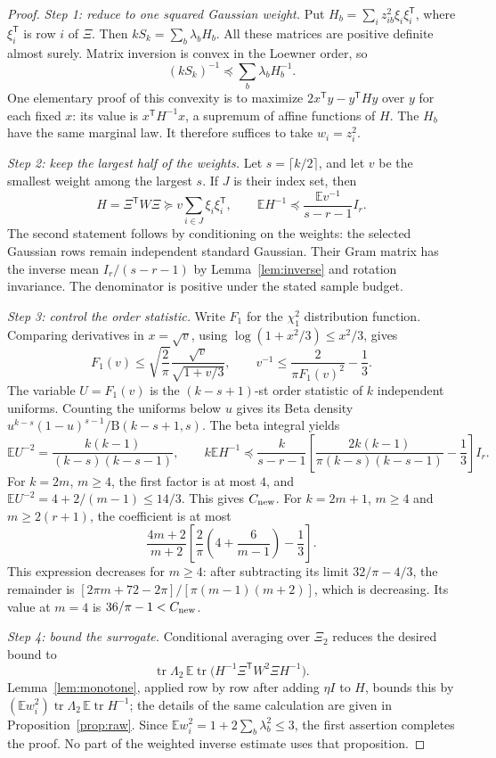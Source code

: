\documentclass[11pt,a4paper]{article}
\theoremstyle{definition}
\theoremstyle{remark}
\numberwithin{equation}{section}
\newcommand{\E}{\mathbb E}
\newcommand{\T}{{\mathsf T}}
\newcommand{\tr}{\operatorname{tr}}
\begin{document}
\begin{proof}
\emph{Step 1: reduce to one squared Gaussian weight.}
Put $H_b=\sum_i z_{ib}^2\xi_i\xi_i^\T$, where $\xi_i^\T$ is row $i$ of $\Xi$.
Then $kS_k=\sum_b\lambda_bH_b$. All these matrices are positive definite
almost surely. Matrix inversion is convex in the Loewner order, so
\[
 (kS_k)^{-1}\preceq\sum_b\lambda_bH_b^{-1}.
\]
One elementary proof of this convexity is to maximize
$2x^\T y-y^\T Hy$ over $y$ for each fixed $x$: its value is
$x^\T H^{-1}x$, a supremum of affine functions of $H$.
The $H_b$ have the same marginal law. It therefore suffices to take
$w_i=z_i^2$.

\emph{Step 2: keep the largest half of the weights.}
Let $s=\lceil k/2\rceil$, and let $v$ be the smallest weight among the
largest $s$. If $J$ is their index set, then
\[
 H=\Xi^\T W\Xi\succeq v\sum_{i\in J}\xi_i\xi_i^\T,
 \qquad
 \E H^{-1}\preceq\frac{\E v^{-1}}{s-r-1}I_r.
\]
The second statement follows by conditioning on the weights: the selected
Gaussian rows remain independent standard Gaussian. Their Gram matrix has
the inverse mean $I_r/(s-r-1)$ by Lemma~\ref{lem:inverse} and rotation
invariance. The denominator is positive under the stated sample budget.

\emph{Step 3: control the order statistic.}
Write $F_1$ for the $\chi_1^2$ distribution function. Comparing derivatives
in $x=\sqrt v$, using $\log(1+x^2/3)\le x^2/3$, gives
\[
 F_1(v)\le\sqrt{\frac2\pi}\frac{\sqrt v}{\sqrt{1+v/3}},
 \qquad
 v^{-1}\le\frac{2}{\pi F_1(v)^2}-\frac13.
\]
The variable $U=F_1(v)$ is the $(k-s+1)$-st order statistic of $k$
independent uniforms. Counting the uniforms below $u$ gives its Beta density
$u^{k-s}(1-u)^{s-1}/\mathrm B(k-s+1,s)$. The beta integral yields
\[
 \E U^{-2}=\frac{k(k-1)}{(k-s)(k-s-1)},
 \qquad
 k\E H^{-1}\preceq
 \frac{k}{s-r-1}
 \left[\frac{2k(k-1)}{\pi(k-s)(k-s-1)}-\frac13\right]I_r.
\]
For $k=2m$, $m\ge4$, the first factor is at most $4$, and
$\E U^{-2}=4+2/(m-1)\le14/3$. This gives $C_{\rm new}$.
For $k=2m+1$, $m\ge4$ and $m\ge2(r+1)$, the coefficient is at most
\[
 \frac{4m+2}{m+2}\left[\frac{2}{\pi}\left(4+\frac6{m-1}\right)-\frac13\right].
\]
This expression decreases for $m\ge4$: after subtracting its limit
$32/\pi-4/3$, the remainder is
$[2\pi m+72-2\pi]/[\pi(m-1)(m+2)]$, which is decreasing.
Its value at $m=4$ is $36/\pi-1<C_{\rm new}$.

\emph{Step 4: bound the surrogate.}
Conditional averaging over $\Xi_2$ reduces the desired bound to
\[
 \tr\Lambda_2\,
 \E\tr\bigl(H^{-1}\Xi^\T W^2\Xi H^{-1}\bigr).
\]
Lemma~\ref{lem:monotone}, applied row by row after adding $\eta I$ to $H$,
bounds this by $(\E w_i^2)\tr\Lambda_2\,\E\tr H^{-1}$; the details of
the same calculation are given in Proposition~\ref{prop:raw}.
Since $\E w_i^2=1+2\sum_b\lambda_b^2\le3$, the first assertion completes
the proof. No part of the weighted inverse estimate uses that proposition.
\end{proof}
\end{document}
